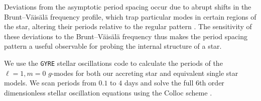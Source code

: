 \documentclass[twocolumn, twocolappendix, oneside]{aastex631}
\newcommand{\bvf}{Brunt–Väisälä frequency\xspace}
\newcommand{\gmodes}{$g$-modes\xspace}
\begin{document}
Deviations from the asymptotic period spacing occur due to abrupt shifts in the \bvf profile, which trap particular modes in certain regions of the star, altering their periods relative to the regular pattern \citep[e.g.][]{Miglio+2008}. The sensitivity of these deviations to the \bvf thus makes the period spacing pattern a useful observable for probing the internal structure of a star.

We use the \texttt{GYRE} stellar oscillations code \citep{Townsend+2013,Townsend+2018,Goldstein+2020,Sun+2023} to calculate the periods of the ${\ell = 1}, {m = 0}$ \gmodes for both our accreting star and equivalent single star models. We scan periods from $0.1$ to $4$ days and solve the full 6th order dimensionless stellar oscillation equations using the Colloc scheme \citep{Dziembowski+1971, Christensen-Dalsgaard+2008}.
\end{document}
